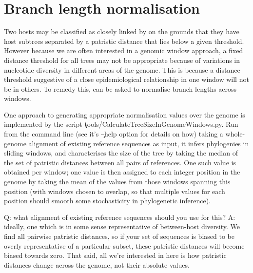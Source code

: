 \section{Branch length normalisation} \label{sec:normalisation}

Two hosts may be classified as closely linked by \pat on the grounds that they have host subtrees separated by a patristic distance that lies below a given threshold.
However because we are often interested in a genomic window approach, a fixed distance threshold for all trees may not be appropriate because of variations in nucleotide diversity in different areas of the genome.
This is because a distance threshold suggestive of a close epidemiological relationship in one window will not be in others.
To remedy this, \pat can be asked to normalise branch lengths across windows.

One approach to generating appropriate normalisation values over the genome is implemented by the script \c{tools/CalculateTreeSizeInGenomeWindows.py}.
Run from the command line (see it's \c{--help} option for details on how) taking a whole-genome alignment of existing reference sequences as input, it infers phylogenies in sliding windows, and characterises the size of the tree by taking the median of the set of patristic distances between all pairs of references.
One such value is obtained per window; one value is then assigned to each integer position in the genome by taking the mean of the values from those windows spanning this position (with windows chosen to overlap, so that multiple values for each position should smooth some stochasticity in phylogenetic inference).

Q: what alignment of existing reference sequences should you use for this?
A: ideally, one which is in some sense representative of between-host diversity.
We find all pairwise patristic distances, so if your set of sequences is biased to be overly representative of a particular subset, these patristic distances will become biased towards zero.
That said, all we're interested in here is how patristic distances change across the genome, not their absolute values.

